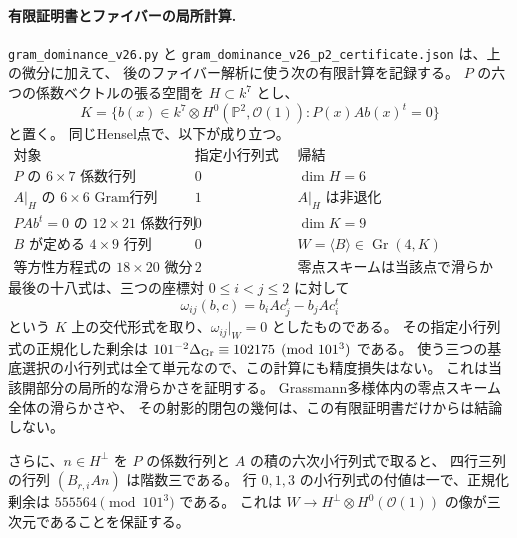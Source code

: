 \paragraph{有限証明書とファイバーの局所計算.}
\nolinkurl{gram_dominance_v26.py} と
\nolinkurl{gram_dominance_v26_p2_certificate.json} は、上の微分に加えて、
後のファイバー解析に使う次の有限計算を記録する。
$P$ の六つの係数ベクトルの張る空間を $H\subset k^7$ とし、
\[
 K=\{b(x)\in k^7\otimes H^0(\mathbb P^2,\mathcal O(1)):
                      P(x)A b(x)^t=0\}
\]
と置く。
同じHensel点で、以下が成り立つ。
\[
\begin{array}{c|c|c}
 \text{対象}&\text{指定小行列式の付値}&\text{帰結}\\\hline
 P\text{ の }6\times7\text{ 係数行列}&0&\dim H=6\\
 A|_H\text{ の }6\times6\text{ Gram行列}&1&A|_H\text{ は非退化}\\
 PAb^t=0\text{ の }12\times21\text{ 係数行列}&0&\dim K=9\\
 B\text{ が定める }4\times9\text{ 行列}&0&W=\langle B\rangle\in\operatorname{Gr}(4,K)\\
 \text{等方性方程式の }18\times20\text{ 微分}&2&\text{零点スキームは当該点で滑らかな曲面}
\end{array}
\]
最後の十八式は、三つの座標対 $0\le i<j\le2$ に対して
\[
 \omega_{ij}(b,c)=b_iAc_j^t-b_jAc_i^t
\]
という $K$ 上の交代形式を取り、$\omega_{ij}|_W=0$ としたものである。
その指定小行列式の正規化した剰余は
$101^{-2}\Delta_{\rm Gr}\equiv102175\pmod{101^3}$ である。
使う三つの基底選択の小行列式は全て単元なので、この計算にも精度損失はない。
これは当該開部分の局所的な滑らかさを証明する。
Grassmann多様体内の零点スキーム全体の滑らかさや、
その射影的閉包の幾何は、この有限証明書だけからは結論しない。

さらに、$n\in H^\perp$ を $P$ の係数行列と $A$ の積の六次小行列式で取ると、
四行三列の行列 $(B_{r,i}An)$ は階数三である。
行 $0,1,3$ の小行列式の付値は一で、正規化剰余は
$555564\pmod{101^3}$ である。
これは $W\to H^\perp\otimes H^0(\mathcal O(1))$ の像が三次元であることを保証する。
